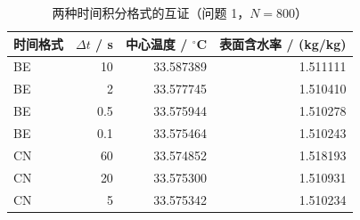 \begin{table}[H]
\centering
\caption{两种时间积分格式的互证（问题 1，$N=800$）}
\label{tab:scheme}
\footnotesize
\begin{tabular}{@{}lrrr@{}}
\toprule
时间格式 & $\Delta t$ / s & 中心温度 / $^\circ$C & 表面含水率 / (kg/kg) \\
\midrule
BE & 10 & 33.587389 & 1.511111 \\
BE & 2 & 33.577745 & 1.510410 \\
BE & 0.5 & 33.575944 & 1.510278 \\
BE & 0.1 & 33.575464 & 1.510243 \\
CN & 60 & 33.574852 & 1.518193 \\
CN & 20 & 33.575300 & 1.510931 \\
CN & 5 & 33.575342 & 1.510234 \\
\bottomrule
\end{tabular}
\end{table}

